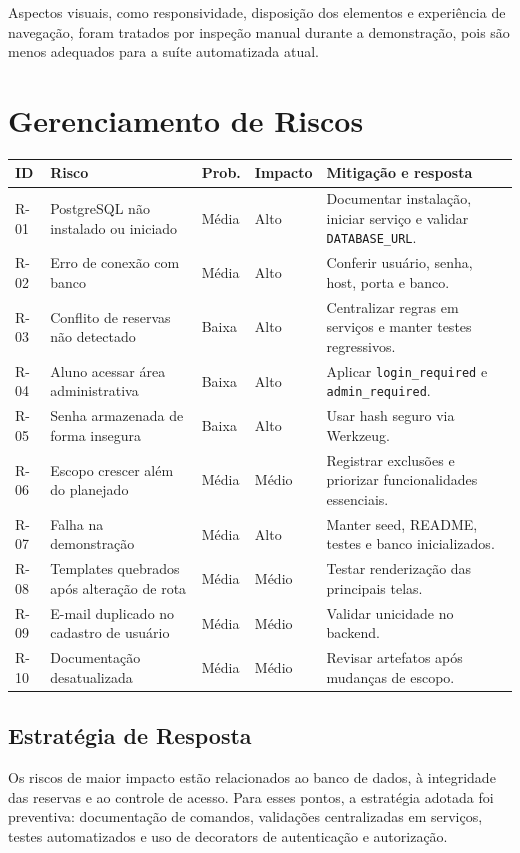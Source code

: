 \documentclass[12pt,a4paper]{article}
\begin{document}
Aspectos visuais, como responsividade, disposição dos elementos e experiência de navegação, foram tratados por inspeção manual durante a demonstração, pois são menos adequados para a suíte automatizada atual.

\section{Gerenciamento de Riscos}
\begin{longtable}{|p{1.2cm}|p{4cm}|p{2cm}|p{1.8cm}|p{5cm}|}
\hline
\textbf{ID} & \textbf{Risco} & \textbf{Prob.} & \textbf{Impacto} & \textbf{Mitigação e resposta} \\ \hline
R-01 & PostgreSQL não instalado ou iniciado & Média & Alto & Documentar instalação, iniciar serviço e validar \texttt{DATABASE\_URL}. \\ \hline
R-02 & Erro de conexão com banco & Média & Alto & Conferir usuário, senha, host, porta e banco. \\ \hline
R-03 & Conflito de reservas não detectado & Baixa & Alto & Centralizar regras em serviços e manter testes regressivos. \\ \hline
R-04 & Aluno acessar área administrativa & Baixa & Alto & Aplicar \texttt{login\_required} e \texttt{admin\_required}. \\ \hline
R-05 & Senha armazenada de forma insegura & Baixa & Alto & Usar hash seguro via Werkzeug. \\ \hline
R-06 & Escopo crescer além do planejado & Média & Médio & Registrar exclusões e priorizar funcionalidades essenciais. \\ \hline
R-07 & Falha na demonstração & Média & Alto & Manter seed, README, testes e banco inicializados. \\ \hline
R-08 & Templates quebrados após alteração de rota & Média & Médio & Testar renderização das principais telas. \\ \hline
R-09 & E-mail duplicado no cadastro de usuário & Média & Médio & Validar unicidade no backend. \\ \hline
R-10 & Documentação desatualizada & Média & Médio & Revisar artefatos após mudanças de escopo. \\ \hline
\end{longtable}

\subsection{Estratégia de Resposta}
Os riscos de maior impacto estão relacionados ao banco de dados, à integridade das reservas e ao controle de acesso. Para esses pontos, a estratégia adotada foi preventiva: documentação de comandos, validações centralizadas em serviços, testes automatizados e uso de decorators de autenticação e autorização.
\end{document}
